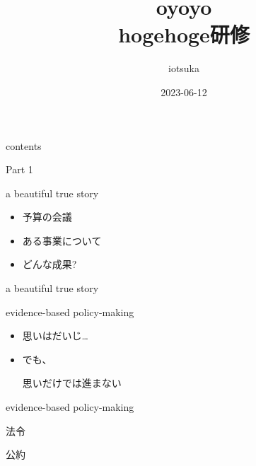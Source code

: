 \documentclass[
  ignorenonframetext,
  aspectratio=169]{beamer}
\title{oyoyo\\
hogehoge研修}
\author{iotsuka}
\date{2023-06-12}
\institute{piyopiyo}
\begin{document}
\frame{\titlepage}

\begin{frame}{contents}
\protect\hypertarget{contents}{}
\Huge

\end{frame}

\begin{frame}{Part 1}
\protect\hypertarget{part-1}{}
\Huge

\scalebox{2}{\textcolor{lightpurple}{データ}}
\end{frame}

\begin{frame}{a beautiful true story}
\protect\hypertarget{a-beautiful-true-story}{}
\Huge

\begin{itemize}
\item[\textbullet] 予算の会議
\item[\textbullet] ある事業について
\item[\textbullet] どんな成果?
\end{itemize}
\end{frame}

\begin{frame}{a beautiful true story}
\protect\hypertarget{a-beautiful-true-story-1}{}
\end{frame}

\begin{frame}{evidence-based policy-making}
\protect\hypertarget{evidence-based-policy-making}{}
\Huge

\begin{itemize}
\item 思いはだいじ\ldots\pause
\item でも、\par
思いだけでは進まない
\end{itemize}
\pause
\vspace*{-22pt}
\hspace*{18pt}
\end{frame}

\begin{frame}{evidence-based policy-making}
\protect\hypertarget{evidence-based-policy-making-1}{}
\Huge

法令\pause

公約\pause

\scalebox{1.732}{\textcolor{red!40}{データ}}
\end{frame}
\end{document}
